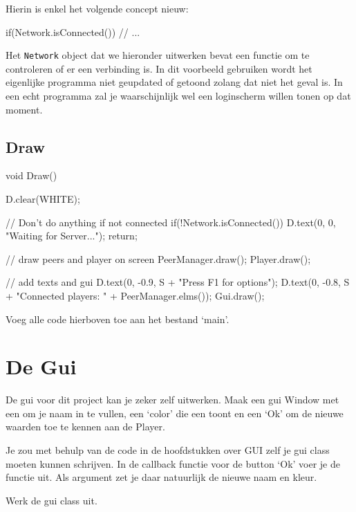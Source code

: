 Hierin is enkel het volgende concept nieuw:

\begin{code}
if(Network.isConnected())
{
	// ...
}
\end{code}

Het \texttt{Network} object dat we hieronder uitwerken bevat een functie om te controleren of er een verbinding is. In dit voorbeeld gebruiken wordt het eigenlijke programma niet geupdated of getoond zolang dat niet het geval is. In een echt programma zal je waarschijnlijk wel een loginscherm willen tonen op dat moment.

\subsection{Draw}
\begin{code}
void Draw()
{
   D.clear(WHITE);
   
   // Don't do anything if not connected
   if(!Network.isConnected())
   {
      D.text(0, 0, "Waiting for Server...");
      return;
   }
   
   // draw peers and player on screen
   PeerManager.draw();
   Player.draw();
   
   // add texts and gui
   D.text(0, -0.9,  S + "Press F1 for options");
   D.text(0, -0.8,  S + "Connected players: " + PeerManager.elms());
   Gui.draw();
}
\end{code}

\begin{exercise}
Voeg alle code hierboven toe aan het bestand `main'.
\end{exercise}

\section{De Gui}
De gui voor dit project kan je zeker zelf uitwerken. Maak een gui Window met een  om je naam in te vullen, een  `color' die een  toont en een  `Ok' om de nieuwe waarden toe te kennen aan de Player.

Je zou met behulp van de code in de hoofdstukken over GUI zelf je gui class moeten kunnen schrijven. In de callback functie voor de button `Ok' voer je de functie  uit. Als argument zet je daar natuurlijk de nieuwe naam en kleur.

\begin{exercise}
Werk de gui class uit.
\end{exercise}